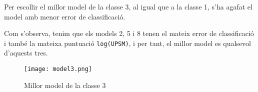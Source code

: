 \documentclass[../informe.tex]{subfiles}
\begin{document}
    Per escollir el millor model de la classe 3, al igual que a la classe 1, s'ha agafat el model amb menor error de classificació.

    \medskip
    Com s'observa, tenim que els models 2, 5 i 8 tenen el mateix error de classificació i també la mateixa puntuació \texttt{log(UPSM)}, i per tant, el millor model es qualsevol d'aquests tres.

    \begin{figure}[H]
        \centering
        \texttt{[image: model3.png]}
        \caption{Millor model de la classe 3}
        \label{fig:model3}
    \end{figure}
\end{document}
